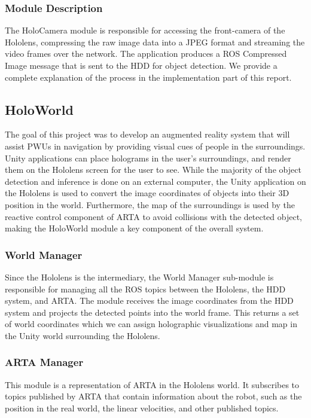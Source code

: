 \subsubsection{Module Description}
The HoloCamera module is responsible for accessing the front-camera of the Hololens, compressing the raw image data into a JPEG format and streaming the video frames over the network. The application produces a ROS Compressed Image message that is sent to the HDD for object detection. We provide a complete explanation of the process in the implementation part of this report.

\subsection{HoloWorld}
The goal of this project was to develop an augmented reality system that will assist PWUs in navigation by providing visual cues of people in the surroundings. Unity applications can place holograms in the user's surroundings, and render them on the Hololens screen for the user to see. While the majority of the object detection and inference is done on an external computer, the Unity application on the Hololens is used to convert the image coordinates of objects into their 3D position in the world. Furthermore, the map of the surroundings is used by the reactive control component of ARTA to avoid collisions with the detected object, making the HoloWorld module a key component of the overall system.

\subsubsection{World Manager}
Since the Hololens is the intermediary, the World Manager sub-module is responsible for managing all the ROS topics between the Hololens, the HDD system, and ARTA. The module receives the image coordinates from the HDD system and projects the detected points into the world frame. This returns a set of world coordinates which we can assign holographic visualizations and map in the Unity world surrounding the Hololens.

\subsubsection{ARTA Manager} \label{sec:alignment}
This module is a representation of ARTA in the Hololens world. It subscribes to topics published by ARTA that contain information about the robot, such as the position in the real world, the linear velocities, and other published topics. 

